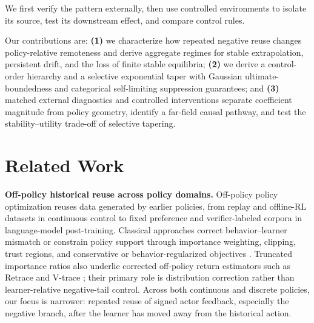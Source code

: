 \documentclass{article}
\theoremstyle{plain}
\theoremstyle{definition}
\theoremstyle{remark}
\begin{document}
We first verify the pattern externally, then use controlled environments to
isolate its source, test its downstream effect, and compare control rules.

Our contributions are: \textbf{(1)} we characterize how repeated negative
reuse changes policy-relative remoteness and derive aggregate regimes for
stable extrapolation, persistent drift, and the loss of finite stable
equilibria; \textbf{(2)} we derive a control-order hierarchy and a selective
exponential taper with Gaussian ultimate-boundedness and categorical
self-limiting suppression guarantees; and \textbf{(3)} matched external
diagnostics and controlled interventions separate coefficient magnitude
from policy geometry, identify a far-field causal pathway, and test the
stability--utility trade-off of selective tapering.


\section{Related Work}
\label{sec:related_work}

\textbf{Off-policy historical reuse across policy domains.}
Off-policy policy optimization reuses data generated by earlier policies,
from replay and offline-RL datasets in continuous control to fixed
preference and verifier-labeled corpora in language-model post-training.
Classical approaches correct behavior--learner mismatch or constrain policy
support through importance weighting, clipping, trust regions, and
conservative or behavior-regularized objectives
\citep{precup2000eligibility,schulman2015trust,
schulman2017proximal,fujimoto2019off,kumar2020conservative,
fujimoto2021minimalist,kostrikov2021offline}. Truncated importance ratios also underlie corrected off-policy return
estimators such as Retrace and V-trace
\citep{munos2016safe,espeholt2018impala}; their primary role is
distribution correction rather than learner-relative negative-tail control. Across both continuous and
discrete policies, our focus is narrower: repeated reuse of signed actor
feedback, especially the negative branch, after the learner has moved away
from the historical action.
\end{document}
